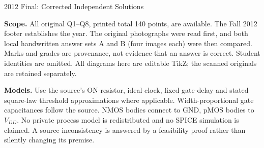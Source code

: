 \documentclass[10pt]{article}
\begin{document}
\begin{center}{\Large 2012 Final: Corrected Independent Solutions}\end{center}
\textbf{Scope.} All original Q1--Q8, printed total 140 points, are available. The Fall 2012 footer establishes the year. The original photographs were read first, and both local handwritten answer sets A and B (four images each) were then compared. Marks and grades are provenance, not evidence that an answer is correct. Student identities are omitted. All diagrams here are editable TikZ; the scanned originals are retained separately.

\textbf{Models.} Use the source's ON-resistor, ideal-clock, fixed gate-delay and stated square-law threshold approximations where applicable. Width-proportional gate capacitances follow the source. NMOS bodies connect to GND, pMOS bodies to $V_{DD}$. No private process model is redistributed and no SPICE simulation is claimed. A source inconsistency is answered by a feasibility proof rather than silently changing its premise.
\end{document}
